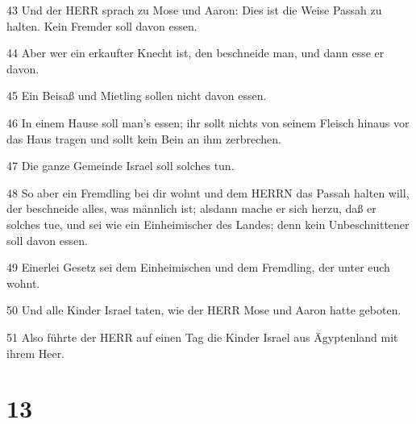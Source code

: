 \par 43 Und der HERR sprach zu Mose und Aaron: Dies ist die Weise Passah zu halten. Kein Fremder soll davon essen.
\par 44 Aber wer ein erkaufter Knecht ist, den beschneide man, und dann esse er davon.
\par 45 Ein Beisaß und Mietling sollen nicht davon essen.
\par 46 In einem Hause soll man's essen; ihr sollt nichts von seinem Fleisch hinaus vor das Haus tragen und sollt kein Bein an ihm zerbrechen.
\par 47 Die ganze Gemeinde Israel soll solches tun.
\par 48 So aber ein Fremdling bei dir wohnt und dem HERRN das Passah halten will, der beschneide alles, was männlich ist; alsdann mache er sich herzu, daß er solches tue, und sei wie ein Einheimischer des Landes; denn kein Unbeschnittener soll davon essen.
\par 49 Einerlei Gesetz sei dem Einheimischen und dem Fremdling, der unter euch wohnt.
\par 50 Und alle Kinder Israel taten, wie der HERR Mose und Aaron hatte geboten.
\par 51 Also führte der HERR auf einen Tag die Kinder Israel aus Ägyptenland mit ihrem Heer.

\chapter{13}

